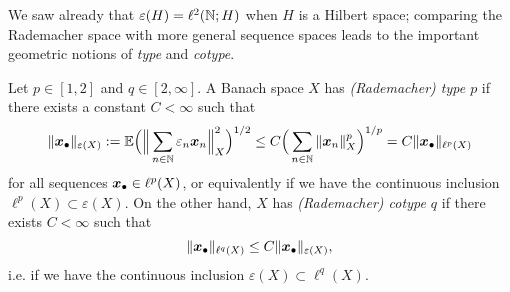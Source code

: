 We saw already that $\varepsilon(H) = \ell^2(\mathbb{N};H)$ when $H$ is a Hilbert space; comparing the Rademacher space with more general sequence spaces leads to the important geometric notions of \emph{type} and \emph{cotype}.

\begin{defn}
  Let $p \in [1,2]$ and $q \in [2,\infty]$.
  A Banach space $X$ has \emph{(Rademacher) type $p$} if there exists a constant $C < \infty$ such that
  \begin{equation*}
    \| \bm{x}_{\bullet} \|_{\varepsilon(X)} := \mathbb{E} \Big( \Big\| \sum_{n \in \mathbb{N}} \varepsilon_{n} \bm{x}_{n} \Big\|_{X}^{2} \Big)^{1/2} \leq C \Big( \sum_{n \in \mathbb{N}} \|\bm{x}_{n}\|_{X}^{p} \Big)^{1/p} = C\|\bm{x}_{\bullet}\|_{\ell^p(X)}
  \end{equation*}
  for all sequences $\bm{x}_{\bullet} \in \ell^{p}(X)$, or equivalently if we have the continuous inclusion $\ell^{p}(X) \subset \varepsilon(X)$.
  On the other hand, $X$ has \emph{(Rademacher) cotype $q$} if there exists $C < \infty$ such that
  \begin{equation*}
    \|\bm{x}_{\bullet}\|_{\ell^q(X)} \leq C \|\bm{x}_{\bullet}\|_{\varepsilon(X)} ,
  \end{equation*}
  i.e. if we have the continuous inclusion $\varepsilon(X) \subset \ell^{q}(X)$.
\end{defn}

